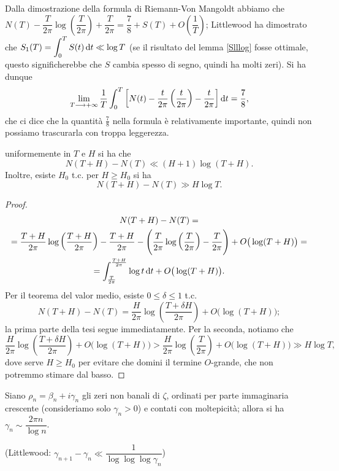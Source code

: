 Dalla dimostrazione della formula di Riemann-Von Mangoldt abbiamo che $N(T)-\dfrac{T}{2\pi}\log\left(\dfrac{T}{2\pi}\right)+\dfrac{T}{2\pi}=\dfrac{7}{8}+S(T)+O\left(\dfrac{1}{T}\right)$;
Littlewood ha dimostrato che $\displaystyle S_1(T)=\int_0^T S(t)\mathop{}\!\mathrm{d} t \ll \log{T}$ (se il risultato del lemma \ref{Slllog} fosse ottimale, questo significherebbe che $S$ cambia spesso di segno, quindi ha molti zeri). Si ha dunque
$$\lim_{T \longrightarrow +\infty} \frac{1}{T} \int_0^T \left[N(t)-\frac{t}{2\pi}\left(\frac{t}{2\pi}\right)-\frac{t}{2\pi}\right]\mathop{}\!\mathrm{d} t=\frac{7}{8},$$
che ci dice che la quantità $\frac{7}{8}$ nella formula è relativamente importante, quindi non possiamo trascurarla con troppa leggerezza.

\begin{cor}
  uniformemente in $T$ e $H$ si ha che
  $$N(T+H)-N(T) \ll (H+1)\log(T+H).$$
  Inoltre, esiste $H_0$ t.c. per $H \ge H_0$ si ha
  $$N(T+H)-N(T) \gg H\log{T}.$$
\end{cor}

\begin{proof}
  \begin{gather*}
    N(T+H)-N(T)= \\
    =\frac{T+H}{2\pi}\log\left(\frac{T+H}{2\pi}\right)-\frac{T+H}{2\pi}-\Bigg(\frac{T}{2\pi}\log\left(\frac{T}{2\pi}\right)-\frac{T}{2\pi}\Bigg)+O\big(\log(T+H)\big)= \\
    =\int_{\frac{T}{2\pi}}^{\frac{T+H}{2\pi}} \log{t}\mathop{}\!\mathrm{d} t+O\big(\log(T+H)\big).
  \end{gather*}
  Per il teorema del valor medio, esiste $0 \le \delta \le 1$ t.c.
  $$N(T+H)-N(T)=\frac{H}{2\pi}\log\left(\frac{T+\delta H}{2\pi}\right)+O\big(\log(T+H)\big);$$
  la prima parte della tesi segue immediatamente. Per la seconda, notiamo che
  $$\frac{H}{2\pi}\log\left(\frac{T+\delta H}{2\pi}\right)+O\big(\log(T+H)\big)>\frac{H}{2\pi}\log\left(\frac{T}{2\pi}\right)+O\big(\log(T+H)\big) \gg H\log{T},$$
  dove serve $H \ge H_0$ per evitare che domini il termine $O$-grande, che non potremmo stimare dal basso.
\end{proof}

\begin{cor}
  Siano $\rho_n=\beta_n+i\gamma_n$ gli zeri non banali di $\zeta$, ordinati per parte immaginaria crescente (consideriamo solo $\gamma_n>0$) e contati con moltepicità; allora si ha $\gamma_n \sim \dfrac{2\pi n}{\log n}$.

  (Littlewood: $\gamma_{n+1}-\gamma_n \ll \dfrac{1}{\log{\log{\log{\gamma_n}}}}$)
\end{cor}

